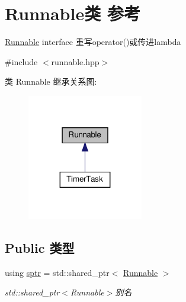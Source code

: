 \hypertarget{classRunnable}{}\section{Runnable类 参考}
\label{classRunnable}


\hyperlink{classRunnable}{Runnable} interface 重写operator()或传进lambda  




{\ttfamily \#include $<$runnable.\+hpp$>$}



类 Runnable 继承关系图\+:\nopagebreak
\begin{figure}[H]
\begin{center}
\leavevmode
\includegraphics[width=143pt]{classRunnable__inherit__graph}
\end{center}
\end{figure}
\subsection*{Public 类型}
\begin{DoxyCompactItemize}
\item 
\mbox{\label{classRunnable_abe8d3066c7305401d6f0aad8e70780f2}} 
using \hyperlink{classRunnable_abe8d3066c7305401d6f0aad8e70780f2}{sptr} = std\+::shared\+\_\+ptr$<$ \hyperlink{classRunnable}{Runnable} $>$
\begin{DoxyCompactList}\small\item\em std\+::shared\+\_\+ptr$<$\+Runnable$>$别名 \end{DoxyCompactList}\end{DoxyCompactItemize}
